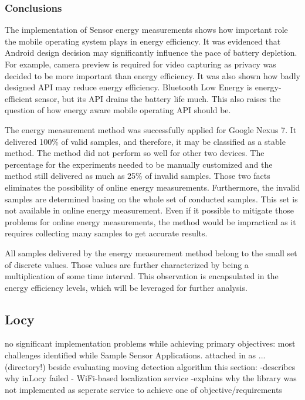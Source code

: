    
\subsubsection{Conclusions}   
\hspace{10pt} The implementation of Sensor energy measurements shows how important role the mobile operating system plays in energy efficiency. It was evidenced that Android design decision may significantly influence the pace of battery depletion. For example, camera preview is required for video capturing as privacy was decided to be more important than energy efficiency. It was also shown how badly designed API may reduce energy efficiency. Bluetooth Low Energy is energy-efficient sensor, but its API drains the battery life much. This also raises the question of how energy aware mobile operating API should be.

The energy measurement method was successfully applied for Google Nexus 7. It delivered 100\% of valid samples, and therefore, it may be classified as a stable method. The method did not perform so well for other two devices. The percentage for the experiments needed to be manually customized and the method still delivered as much as 25\% of invalid samples. Those two facts eliminates the possibility of online energy measurements. Furthermore, the invalid samples are determined basing on the whole set of conducted samples. This set is not available in online energy measurement. Even if it possible to mitigate those problems for online energy measurements, the method would be impractical as it requires collecting many samples to get accurate results.  

All samples delivered by the energy measurement method belong to the small set of discrete values. Those values are further characterized by being a multiplication of some time interval. This observation is encapsulated in the energy efficiency levels, which will be leveraged for further analysis. 

\subsection{Locy}
no significant implementation problems while achieving primary objectives:
	most challenges identified while Sample Sensor Applications.
	attached in as ... (directory!)
beside evaluating moving detection algorithm
this section:
	-describes why inLocy failed - WiFi-based localization service 
	-explains why the library was not implemented as seperate service to achieve one of objective/requirements

